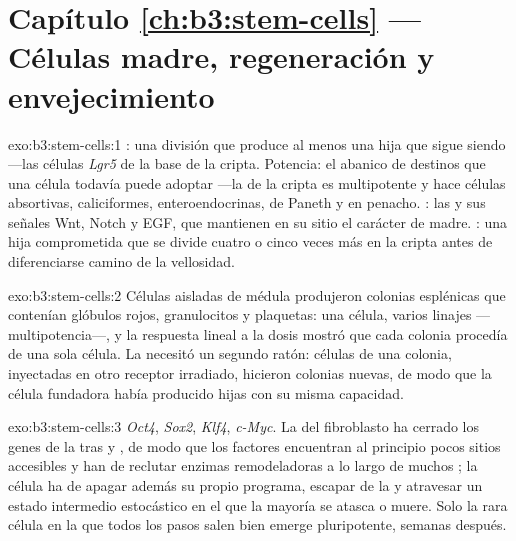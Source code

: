 \section*{Capítulo \ref{ch:b3:stem-cells} --- Células madre, regeneración y envejecimiento}

\begin{solution}{exo:b3:stem-cells:1}
: una división que produce al menos una hija que sigue
siendo  ---las células \emph{Lgr5} de la base de la cripta.
Potencia: el abanico de destinos que una célula todavía puede adoptar
---la  de la cripta es multipotente y hace células
absortivas, caliciformes, enteroendocrinas, de Paneth y en penacho.
: las  y sus señales Wnt, Notch y EGF, que
mantienen en su sitio el carácter de madre. : una hija comprometida que se divide cuatro o cinco veces más
en la cripta antes de diferenciarse camino de la vellosidad.
\end{solution}

\begin{solution}{exo:b3:stem-cells:2}
Células aisladas de médula produjeron colonias esplénicas que contenían
glóbulos rojos, granulocitos y plaquetas: una célula, varios linajes
---multipotencia---, y la respuesta lineal a la dosis mostró que cada
colonia procedía de una sola célula. La  necesitó un
segundo ratón: células de una colonia, inyectadas en otro receptor
irradiado, hicieron colonias nuevas, de modo que la célula fundadora
había producido hijas con su misma capacidad.
\end{solution}

\begin{solution}{exo:b3:stem-cells:3}
\emph{Oct4}, \emph{Sox2}, \emph{Klf4}, \emph{c-Myc}. La  del
fibroblasto ha cerrado los genes de la  tras
 y , de modo que los factores
encuentran al principio pocos sitios accesibles y han de reclutar
enzimas remodeladoras a lo largo de muchos ; la célula
ha de apagar además su propio programa, escapar de la  y
atravesar un estado intermedio estocástico en el que la mayoría se
atasca o muere. Solo la rara célula en la que todos los pasos salen
bien emerge pluripotente, semanas después.
\end{solution}

